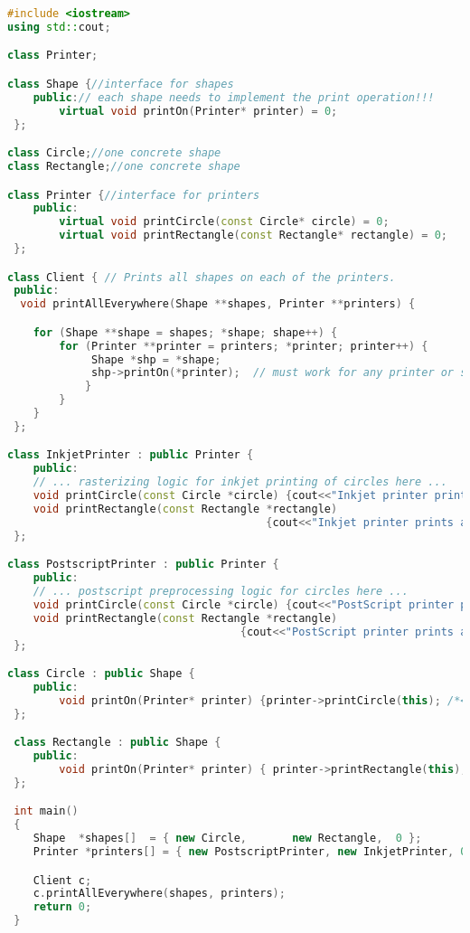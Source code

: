 \documentclass{book}
\begin{document}
\begin{lstlisting}[caption={Double Dispatch sample code 2},label={lst:vps12},language=C++]
#include <iostream>
using std::cout;

class Printer;

class Shape {//interface for shapes
	public:// each shape needs to implement the print operation!!!
    	virtual void printOn(Printer* printer) = 0;
 };

class Circle;//one concrete shape
class Rectangle;//one concrete shape

class Printer {//interface for printers 
	public:
    	virtual void printCircle(const Circle* circle) = 0;
        virtual void printRectangle(const Rectangle* rectangle) = 0;
 };

class Client { // Prints all shapes on each of the printers.
 public:
  void printAllEverywhere(Shape **shapes, Printer **printers) {

	for (Shape **shape = shapes; *shape; shape++) {
    	for (Printer **printer = printers; *printer; printer++) {
        	 Shape *shp = *shape;
	         shp->printOn(*printer);  // must work for any printer or shape !
	        }
	    }
    }
 };

class InkjetPrinter : public Printer {
	public:
	// ... rasterizing logic for inkjet printing of circles here ...
	void printCircle(const Circle *circle) {cout<<"Inkjet printer prints a circle.";}
	void printRectangle(const Rectangle *rectangle)
                                        {cout<<"Inkjet printer prints a rectangle.";}
 };

class PostscriptPrinter : public Printer {
	public:
	// ... postscript preprocessing logic for circles here ...
	void printCircle(const Circle *circle) {cout<<"PostScript printer prints a cirlce.";}
	void printRectangle(const Rectangle *rectangle)
                                    {cout<<"PostScript printer prints a rectangle.";}
 };

class Circle : public Shape {
	public:
	    void printOn(Printer* printer) {printer->printCircle(this); /*<--the "trick"!*/}
 };

 class Rectangle : public Shape {
	public:
	    void printOn(Printer* printer) { printer->printRectangle(this); }
 };

 int main()
 {
	Shape  *shapes[]  = { new Circle,		new Rectangle,	0 };
	Printer *printers[] = { new PostscriptPrinter, new InkjetPrinter, 0 };

	Client c;
	c.printAllEverywhere(shapes, printers);
	return 0;
 }
\end{lstlisting}
\end{document}
